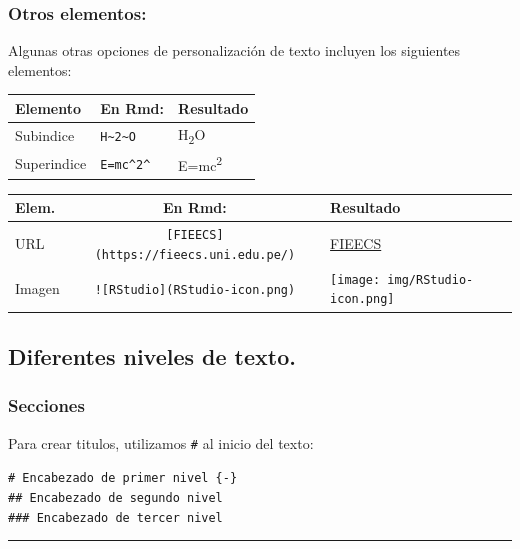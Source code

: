 \documentclass[
]{article}
\begin{document}
\hypertarget{otros-elementos}{%
\subsubsection{Otros elementos:}\label{otros-elementos}}

Algunas otras opciones de personalización de texto incluyen los
siguientes elementos:

\begin{longtable}[]{@{}lll@{}}
\toprule
Elemento & En Rmd: & Resultado \\
\midrule
\endhead
Subindice & \texttt{H\textasciitilde{}2\textasciitilde{}O} &
H\textsubscript{2}O \\
Superindice & \texttt{E=mc\^{}2\^{}} & E=mc\textsuperscript{2} \\
\bottomrule
\end{longtable}

\begin{longtable}[]{@{}lcl@{}}
\toprule
Elem. & En Rmd: & Resultado \\
\midrule
\endhead
URL & \texttt{{[}FIEECS{]}(https://fieecs.uni.edu.pe/)} &
\href{https://fieecs.uni.edu.pe/}{FIEECS} \\
Imagen & \texttt{!{[}RStudio{]}(RStudio-icon.png)} &
\texttt{[image: img/RStudio-icon.png]} \\
\bottomrule
\end{longtable}

\hypertarget{niveles}{%
\subsection{Diferentes niveles de texto.}\label{niveles}}

\hypertarget{sec}{%
\subsubsection{Secciones}\label{sec}}

Para crear titulos, utilizamos \texttt{\#} al inicio del texto:

\texttt{\#\ Encabezado\ de\ primer\ nivel\ \{-\}}~\\
\texttt{\#\#\ Encabezado\ de\ segundo\ nivel}~\\
\texttt{\#\#\#\ Encabezado\ de\ tercer\ nivel}~\\

\begin{center}\rule{0.5\linewidth}{0.5pt}\end{center}
\end{document}
